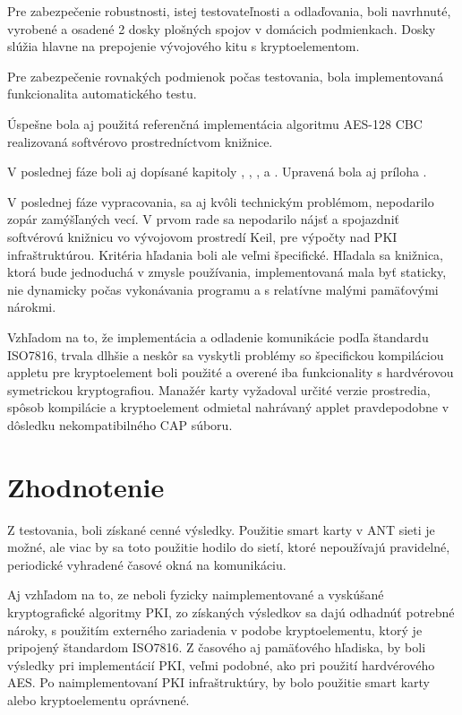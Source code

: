 \documentclass[12pt,a4paper,oneside,openright]{report}
\begin{document}
Pre zabezpečenie robustnosti, istej testovateľnosti a odlaďovania, boli navrhnuté, vyrobené a osadené 2 dosky plošných spojov v domácich podmienkach. Dosky slúžia hlavne na prepojenie vývojového kitu s kryptoelementom.

Pre zabezpečenie rovnakých podmienok počas testovania, bola implementovaná funkcionalita automatického testu.

Úspešne bola aj použitá referenčná implementácia algoritmu AES-128 CBC realizovaná softvérovo prostredníctvom knižnice.

V poslednej fáze boli aj dopísané kapitoly , , ,  a . Upravená bola aj príloha .

V poslednej fáze vypracovania, sa aj kvôli technickým problémom, nepodarilo zopár zamýšľaných vecí.
V prvom rade sa nepodarilo nájsť a spojazdniť softvérovú knižnicu vo vývojovom prostredí Keil, pre výpočty nad PKI infraštruktúrou. Kritéria hľadania boli ale veľmi špecifické. Hľadala sa knižnica, ktorá bude jednoduchá v zmysle používania, implementovaná mala byť  staticky, nie dynamicky počas vykonávania programu a s relatívne malými pamäťovými nárokmi.

Vzhľadom na to, že implementácia a odladenie komunikácie podľa štandardu ISO7816, trvala dlhšie a neskôr sa vyskytli problémy so špecifickou kompiláciou appletu pre kryptoelement  boli použité a overené iba funkcionality s hardvérovou symetrickou kryptografiou. Manažér karty vyžadoval určité verzie prostredia, spôsob kompilácie a kryptoelement odmietal nahrávaný applet pravdepodobne v dôsledku nekompatibilného CAP súboru.


\section{Zhodnotenie}

Z testovania, boli získané cenné výsledky. Použitie smart karty v ANT sieti je možné, ale viac by sa toto použitie hodilo do sietí, ktoré nepoužívajú pravidelné, periodické vyhradené časové okná na komunikáciu.

Aj vzhľadom na to, ze neboli fyzicky naimplementované a vyskúšané kryptografické algoritmy PKI, zo získaných výsledkov sa dajú odhadnúť potrebné nároky, s použitím externého zariadenia v podobe kryptoelementu, ktorý je pripojený štandardom ISO7816. Z časového aj pamäťového hľadiska, by boli výsledky pri implementácií PKI, veľmi podobné, ako pri použití hardvérového AES. Po naimplementovaní PKI infraštruktúry, by bolo použitie smart karty alebo kryptoelementu oprávnené. 
\end{document}
